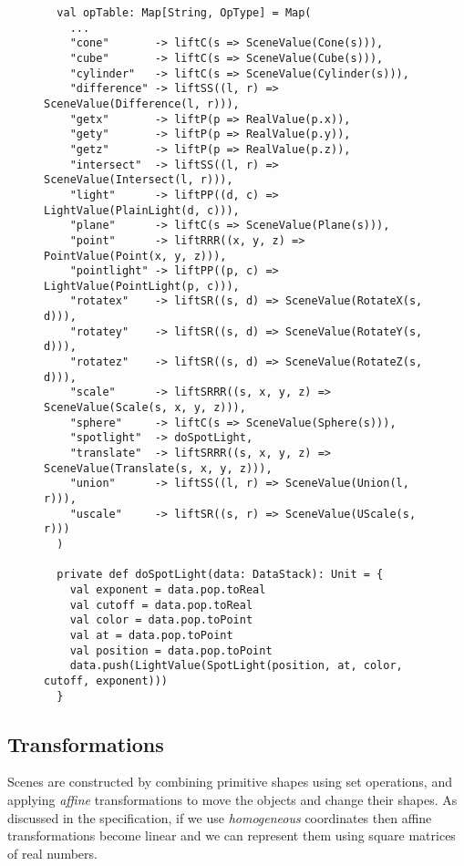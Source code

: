\begin{figure}
\begin{verbatim}
  val opTable: Map[String, OpType] = Map(
    ...
    "cone"       -> liftC(s => SceneValue(Cone(s))),
    "cube"       -> liftC(s => SceneValue(Cube(s))),
    "cylinder"   -> liftC(s => SceneValue(Cylinder(s))),
    "difference" -> liftSS((l, r) => SceneValue(Difference(l, r))),
    "getx"       -> liftP(p => RealValue(p.x)),
    "gety"       -> liftP(p => RealValue(p.y)),
    "getz"       -> liftP(p => RealValue(p.z)),
    "intersect"  -> liftSS((l, r) => SceneValue(Intersect(l, r))),
    "light"      -> liftPP((d, c) => LightValue(PlainLight(d, c))),
    "plane"      -> liftC(s => SceneValue(Plane(s))),
    "point"      -> liftRRR((x, y, z) => PointValue(Point(x, y, z))),
    "pointlight" -> liftPP((p, c) => LightValue(PointLight(p, c))),
    "rotatex"    -> liftSR((s, d) => SceneValue(RotateX(s, d))),
    "rotatey"    -> liftSR((s, d) => SceneValue(RotateY(s, d))),
    "rotatez"    -> liftSR((s, d) => SceneValue(RotateZ(s, d))),
    "scale"      -> liftSRRR((s, x, y, z) => SceneValue(Scale(s, x, y, z))),
    "sphere"     -> liftC(s => SceneValue(Sphere(s))),
    "spotlight"  -> doSpotLight,
    "translate"  -> liftSRRR((s, x, y, z) => SceneValue(Translate(s, x, y, z))),
    "union"      -> liftSS((l, r) => SceneValue(Union(l, r))),
    "uscale"     -> liftSR((s, r) => SceneValue(UScale(s, r)))
  )

  private def doSpotLight(data: DataStack): Unit = {
    val exponent = data.pop.toReal
    val cutoff = data.pop.toReal
    val color = data.pop.toPoint
    val at = data.pop.toPoint
    val position = data.pop.toPoint
    data.push(LightValue(SpotLight(position, at, color, cutoff, exponent)))
  }
\end{verbatim}
\getcaption
\end{figure}


\subsection{Transformations\label{sec:transformations}}

Scenes are constructed by combining primitive shapes using set operations,
and applying \emph{affine} transformations
to move the objects and change their shapes.
As discussed in the specification,
if we use \emph{homogeneous} coordinates then
affine transformations become linear
and we can represent them using square matrices of real numbers.

